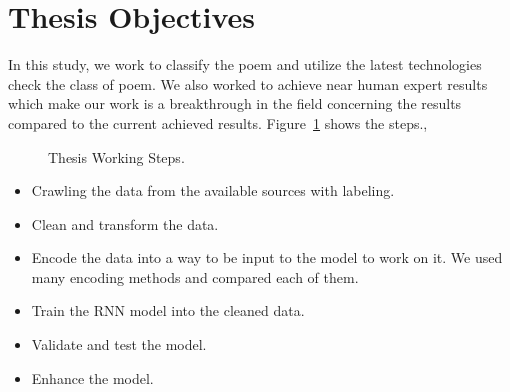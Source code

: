 \section{Thesis Objectives}
In this study, we work to classify the poem and utilize the latest technologies check the class of poem. We also worked to achieve near human expert results which make our work is a breakthrough in the field concerning the results compared to the current achieved results. Figure~\ref{fig:thesis_cycle} shows the steps.,
\begin{figure}[h!]
   
  \caption{Thesis Working Steps.}
  \label{fig:thesis_cycle}
\end{figure}

\begin{itemize}
\item Crawling the data from the available sources with labeling.
\item Clean and transform the data.
\item Encode the data into a way to be input to the model to work on it. We used many encoding methods and compared each of them.
\item Train the RNN model into the cleaned data.
\item Validate and test the model.
\item Enhance the model.

\end{itemize}








%	
%	
%	



